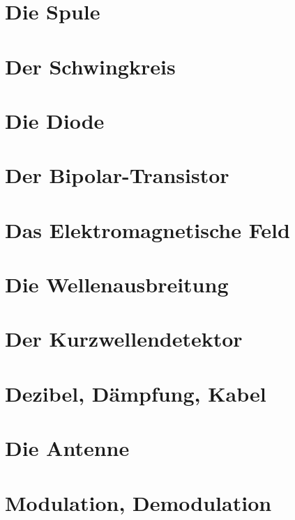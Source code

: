 \documentclass[ngerman,openany,oneside]{Script}
\begin{document}


\newpage
\chapter{Die Spule}


\chapter{Der Schwingkreis}


\chapter{Die Diode}


\chapter{Der Bipolar-Transistor}


\chapter{Das Elektromagnetische Feld}


\chapter{Die Wellenausbreitung}


\chapter{Der Kurzwellendetektor}


\chapter{Dezibel, Dämpfung, Kabel}


\chapter{Die Antenne}


\chapter{Modulation, Demodulation}



\end{document}
